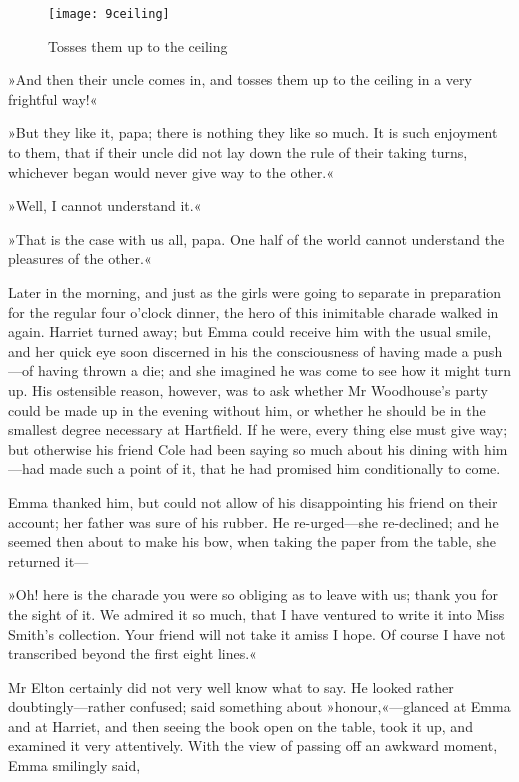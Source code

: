 \begin{figure}[tbph]
\centering
\texttt{[image: 9ceiling]}
\caption{Tosses them up to the ceiling}
\end{figure}

»And then their uncle comes in, and tosses them up to the ceiling in a very frightful way!«

»But they like it, papa; there is nothing they like so much. It is such enjoyment to them, that if their uncle did not lay down the rule of their taking turns, whichever began would never give way to the other.«

»Well, I cannot understand it.«

»That is the case with us all, papa. One half of the world cannot understand the pleasures of the other.«

Later in the morning, and just as the girls were going to separate in preparation for the regular four o'clock dinner, the hero of this inimitable charade walked in again. Harriet turned away; but Emma could receive him with the usual smile, and her quick eye soon discerned in his the consciousness of having made a push—of having thrown a die; and she imagined he was come to see how it might turn up. His ostensible reason, however, was to ask whether Mr Woodhouse's party could be made up in the evening without him, or whether he should be in the smallest degree necessary at Hartfield. If he were, every thing else must give way; but otherwise his friend Cole had been saying so much about his dining with him—had made such a point of it, that he had promised him conditionally to come.

Emma thanked him, but could not allow of his disappointing his friend on their account; her father was sure of his rubber. He re-urged—she re-declined; and he seemed then about to make his bow, when taking the paper from the table, she returned it—

»Oh! here is the charade you were so obliging as to leave with us; thank you for the sight of it. We admired it so much, that I have ventured to write it into Miss Smith's collection. Your friend will not take it amiss I hope. Of course I have not transcribed beyond the first eight lines.«

Mr Elton certainly did not very well know what to say. He looked rather doubtingly—rather confused; said something about »honour,«—glanced at Emma and at Harriet, and then seeing the book open on the table, took it up, and examined it very attentively. With the view of passing off an awkward moment, Emma smilingly said,

